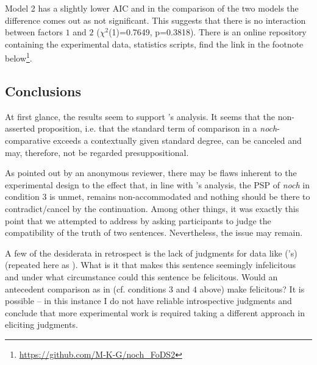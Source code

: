 \documentclass[output=paper
,modfonts
,nonflat]{langsci/langscibook}
\begin{document}
Model 2 has a slightly lower AIC and in the comparison of the two models the difference comes out as not significant. This suggests that there is no interaction between factors $1$ and $2$ ($\chi^{2}$(1)=0.7649, p=0.3818). There is an online repository containing the experimental data, statistics scripts, find the link in the footnote below\footnote{\url{https://github.com/M-K-G/noch_FoDS2}}\citet{github_website}.

\subsection{Conclusions}
At first glance, the results seem to support \citeauthor{umbach2009a_comp}'s \citeyearpar{umbach2009a_comp} analysis. It seems that the non-asserted proposition, i.e. that the standard term of comparison in a \textit{noch}-comparative exceeds a contextually given standard degree, can be canceled and may, therefore, not be regarded presuppositional.

As pointed out by an anonymous reviewer, there may be flaws inherent to the experimental design to the effect that, in line with \citeauthor{Hofstetter2013}'s analysis, the PSP of \textit{noch} in condition $3$ is unmet, remains non-accommodated and nothing should be there to contradict/cancel by the continuation. Among other things, it was exactly this point that we attempted to address by asking participants to judge the compatibility of the truth of two sentences. Nevertheless, the issue may remain.

A few of the desiderata in retrospect is the lack of judgments for data like (\citeauthor{Hofstetter2013}'s)  (repeated here as ). What is it that makes this sentence seemingly infelicitous and under what circumstance could this sentence be felicitous. Would an antecedent comparison as in  (cf. conditions $3$ and $4$ above) make  felicitous? It is possible -- in this instance I do not have reliable introspective judgments and conclude that more experimental work is required taking a different approach in eliciting judgments. %
\end{document}
